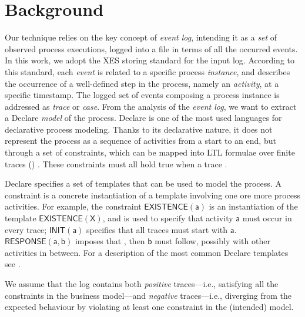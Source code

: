 
\section{Background}\label{sec:back}

Our technique relies on the key concept of \emph{event log}, intending it as a \emph{set} of observed process executions, logged into a file in terms of all the occurred events.
%
%
In this work, we adopt the \ac{XES} storing standard \cite{XES} for the input log. According to this standard, each \emph{event} is related to a specific process \emph{instance}, and describes the occurrence of a well-defined step in the process, namely an \emph{activity}, at a specific timestamp. The logged set of events composing a process instance is addressed as \emph{trace} or \emph{case}. 
From the analysis of the \emph{event log}, we want to extract a Declare \cite{2008-Pesic,2009-Aalst} \emph{model} of the process.
Declare is one of the most used languages for declarative process modeling. Thanks to its declarative nature, it does not represent the process as a sequence of activities from a start to an end, but through a set of constraints, which can be mapped into \ac{LTL} formulae over finite traces (\ltlf) \cite{DBLP:journals/tweb/MontaliPACMS10,DBLP:conf/ijcai/GiacomoV13}. These constraints must all hold true when a trace .

Declare specifies a set of templates that can be used to model the process. 
A constraint is a concrete instantiation of a template involving one ore more process activities.
For example, the constraint $\mathsf{EXISTENCE(a)}$ is an instantiation of the template $\mathsf{EXISTENCE(X)}$, and is used to specify that activity $\mathsf{a}$ must occur in every trace; $\mathsf{INIT(a)}$ specifies that all traces must start with $\mathsf{a}$. $\mathsf{RESPONSE(a,b)}$ imposes that , then $\mathsf{b}$ must follow, possibly with other activities in between. %
For a description of the most common Declare templates see \cite{2008-Pesic}. 

We assume that the log contains both \emph{positive} traces---i.e., satisfying all the constraints in the business model---and \emph{negative} traces---i.e., diverging from the expected behaviour by violating at least one constraint in the (intended) model. 

